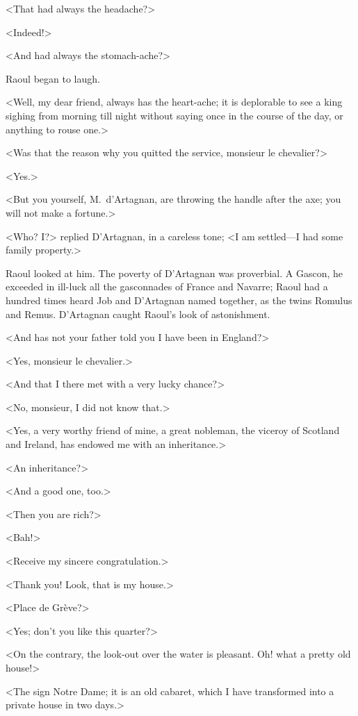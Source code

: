 <That  had always the headache?>

<Indeed!>

<And  had always the stomach-ache?>

Raoul began to laugh.

<Well, my dear friend,  always has the heart-ache; it is deplorable to see a king sighing from morning till night without saying once in the course of the day,   or anything to rouse one.>

<Was that the reason why you quitted the service, monsieur le chevalier?>

<Yes.>

<But you yourself, M.~d'Artagnan, are throwing the handle after the axe; you will not make a fortune.>

<Who? I\@?> replied D'Artagnan, in a careless tone; <I am settled—I had some family property.>

Raoul looked at him. The poverty of D'Artagnan was proverbial. A Gascon, he exceeded in ill-luck all the gasconnades of France and Navarre; Raoul had a hundred times heard Job and D'Artagnan named together, as the twins Romulus and Remus. D'Artagnan caught Raoul's look of astonishment.

<And has not your father told you I have been in England?>

<Yes, monsieur le chevalier.>

<And that I there met with a very lucky chance?>

<No, monsieur, I did not know that.>

<Yes, a very worthy friend of mine, a great nobleman, the viceroy of Scotland and Ireland, has endowed me with an inheritance.>

<An inheritance?>

<And a good one, too.>

<Then you are rich?>

<Bah!>

<Receive my sincere congratulation.>

<Thank you! Look, that is my house.>

<Place de Grève?>

<Yes; don't you like this quarter?>

<On the contrary, the look-out over the water is pleasant. Oh! what a pretty old house!>

<The sign Notre Dame; it is an old cabaret, which I have transformed into a private house in two days.>

